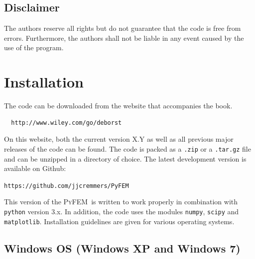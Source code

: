 \documentclass{article}
\newcommand{\progname}{\textsc{PyFEM}}
\begin{document}
\subsection*{Disclaimer}

\noindent
The authors reserve all rights but do not guarantee that the code is    
free from errors. Furthermore, the authors shall not be liable in any   
event caused by the use of the program.                                 

\section{Installation}

The code can be downloaded from the website that accompanies the book.

\begin{verbatim}
  http://www.wiley.com/go/deborst
\end{verbatim}
\noindent
On this website, both the current version X.Y as well as all previous major releases of the code
can be found. The code is packed as a \texttt{.zip} or a \texttt{.tar.gz} file and 
can be unzipped in a directory of choice. The latest development version is available on Github:

\texttt{https://github.com/jjcremmers/PyFEM}

This version of the \progname~is written to work properly in combination with 
\texttt{python} version 3.x. In addition, the code uses the modules \texttt{numpy}, \texttt{scipy} and
\texttt{matplotlib}. Installation guidelines are given for various operating systems.

\subsection{Windows OS (Windows XP and Windows 7)}
\end{document}
